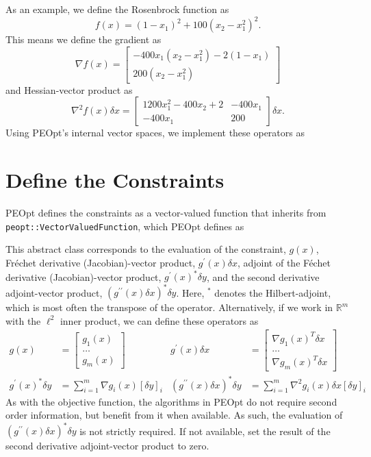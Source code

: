 \documentclass{report}
\newcommand{\re}{\mathbb{R}}
\begin{document}
        As an example, we define the Rosenbrock function as
$$
        f(x)=(1-x_1)^2+100(x_2-x_1^2)^2.
$$
This means we define the gradient as
$$
        \nabla f(x)=\begin{bmatrix}
        -400x_1(x_2-x_1^2)-2(1-x_1)\\
        200(x_2-x_1^2)
        \end{bmatrix}
$$
and Hessian-vector product as
$$
        \nabla^2 f(x)\delta x=
        \begin{bmatrix}
            1200x_1^2-400x_2+2 & -400x_1\\
            -400x_1 & 200
        \end{bmatrix}\delta x.
$$
Using PEOpt's internal vector spaces, we implement these operators as


\section{Define the Constraints}

        PEOpt defines the constraints as a vector-valued function that inherits from \texttt{peopt::VectorValuedFunction}, which PEOpt defines as

This abstract class corresponds to the evaluation of the constraint, $g(x)$, Fr\'{e}chet derivative (Jacobian)-vector product, $g^\prime(x)\delta x$, adjoint of the F\'{e}chet derivative (Jacobian)-vector product, $g^\prime(x)^*\delta y$, and the second derivative adjoint-vector product, $(g^{\prime\prime}(x)\delta x)^*\delta y$.  Here, $^*$ denotes the Hilbert-adjoint, which is most often the transpose of the operator.  Alternatively, if we work in $\re^m$ with the $\ell^2$ inner product, we can define these operators as
\begin{align*}
        g(x)&=\begin{bmatrix}
            g_1(x)\\
            \dots\\
            g_m(x)
        \end{bmatrix}
        & g^\prime(x)\delta x&=\begin{bmatrix}
                \nabla g_1(x)^T \delta x\\
                \dots\\
                \nabla g_m(x)^T \delta x
        \end{bmatrix}\\
        g^\prime(x)^*\delta y&=
        \sum\limits_{i=1}^m \nabla g_i(x) [\delta y]_i 
        & (g^{\prime\prime}(x)\delta x)^*\delta y&=
        \sum\limits_{i=1}^m \nabla^2 g_i(x)\delta x [\delta y]_i 
\end{align*}
As with the objective function, the algorithms in PEOpt do not require second order information, but benefit from it when available.  As such, the evaluation of $(g^{\prime\prime}(x)\delta x)^*\delta y$ is not strictly required.  If not available, set the result of the second derivative adjoint-vector product to zero.
\end{document}
